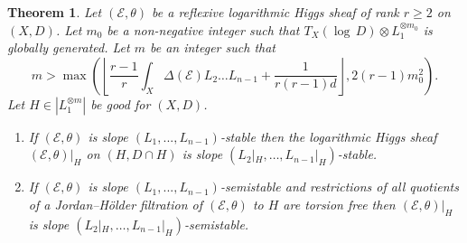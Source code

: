 \documentclass[12pt]{article}
\theoremstyle{plain}
\newtheorem{Theorem}[Thm]{\sc Theorem}
\theoremstyle{definition}
\theoremstyle{remark}
\newcommand{\cE}{{\mathcal E}}
\begin{document}
\begin{Theorem}	\label{restriction-for-Higgs-char-0}
	Let  $(\cE , \theta )$ be a reflexive logarithmic Higgs sheaf of rank $r\ge 2$ on $(X,D)$. 
	Let $m_0$ be a non-negative integer such that $T_X (\log \, D)\otimes L_1^{\otimes m_0}$  is globally generated. Let   $m$ be an integer such that
	$$m>\max \left(\left\lfloor \frac{r-1}{ r}\int_X\Delta (\cE)L_2\dots L_{n-1} +\frac{1}{r(r-1)d}
	\right\rfloor , 2(r-1)m_0^2 \right).$$
	Let $H\in |L_1^{\otimes m}|$  be good for $(X,D)$.
	\begin{enumerate}
		\item If  $(\cE , \theta )$ is slope $(L_1,...,L_{n-1})$-stable 	then the logarithmic Higgs sheaf $(\cE , \theta )|_H$ on $(H,D\cap H)$ is  slope $(L_2|_H,\dots ,L_{n-1}|_H)$-stable.
		\item If  $(\cE , \theta )$ is slope $(L_1,...,L_{n-1})$-semistable 	and restrictions of all quotients of a Jordan--H\"older filtration of $(\cE , \theta )$ to $H$ are torsion free then  $(\cE , \theta )|_H$ is  slope $(L_2|_H,\dots ,L_{n-1}|_H)$-semistable. 
	\end{enumerate}
\end{Theorem}
\end{document}

